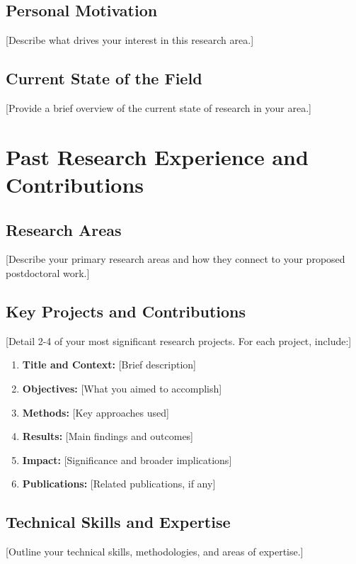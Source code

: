 \documentclass[11pt,a4paper]{article}
\begin{document}
\subsection{Personal Motivation}
[Describe what drives your interest in this research area.]

\subsection{Current State of the Field}
[Provide a brief overview of the current state of research in your area.]

\section{Past Research Experience and Contributions}
\subsection{Research Areas}
[Describe your primary research areas and how they connect to your proposed postdoctoral work.]

\subsection{Key Projects and Contributions}
[Detail 2-4 of your most significant research projects. For each project, include:]

\begin{enumerate}[label=\textbf{Project \arabic*:}, leftmargin=2em, itemsep=0.5em]
    \item \textbf{Title and Context:} [Brief description]
    \item \textbf{Objectives:} [What you aimed to accomplish]
    \item \textbf{Methods:} [Key approaches used]
    \item \textbf{Results:} [Main findings and outcomes]
    \item \textbf{Impact:} [Significance and broader implications]
    \item \textbf{Publications:} [Related publications, if any]
\end{enumerate}

\subsection{Technical Skills and Expertise}
[Outline your technical skills, methodologies, and areas of expertise.]
\end{document}
